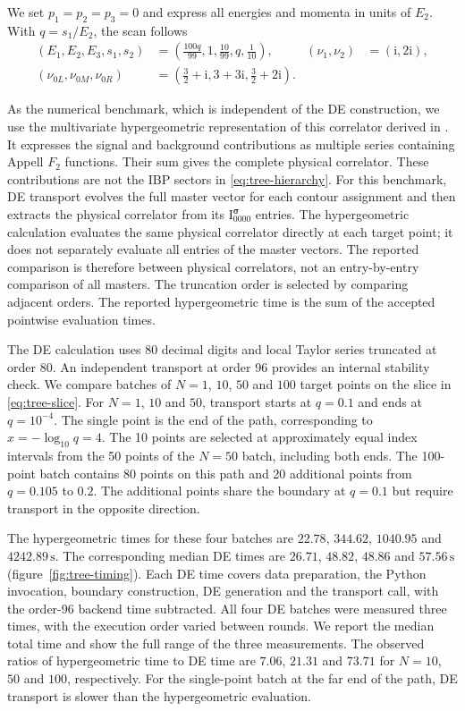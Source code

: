 \documentclass[11pt,a4paper]{article}
\newcommand{\ii}{\mathrm i}
\begin{document}
We set $p_1=p_2=p_3=0$ and express all energies and momenta in units of $E_2$.
With $q=s_1/E_2$, the scan follows
\begin{equation}
 \begin{aligned}
 (E_1,E_2,E_3,s_1,s_2)
 &=\left(\frac{100q}{99},1,\frac{10}{99},q,\frac{1}{10}\right),
 & (\nu_1,\nu_2)&=(\ii,2\ii),\\
 (\nu_{0L},\nu_{0M},\nu_{0R})
 &=\left(\frac32+\ii,3+3\ii,\frac32+2\ii\right).&&
 \end{aligned}
 \label{eq:tree-slice}
\end{equation}

As the numerical benchmark, which is independent of the DE construction, we use the multivariate
hypergeometric representation of this correlator derived
in \cite{Xianyu:2023ytd}.
It expresses the signal and background contributions as multiple series
containing Appell $F_2$ functions. Their sum gives the complete physical
correlator. These contributions are not the IBP sectors in
\eqref{eq:tree-hierarchy}.
For this benchmark, DE transport evolves the full master vector for each
contour assignment and then extracts the physical correlator from its
$\text{I}^{\boldsymbol\sigma}_{0000}$ entries. The hypergeometric calculation
evaluates the same physical correlator directly at each target point;
it does not separately evaluate all entries of the master vectors.
The reported comparison is therefore between physical correlators,
not an entry-by-entry comparison of all masters.
The truncation order is selected by comparing adjacent orders.
The reported hypergeometric time is the sum of the accepted
pointwise evaluation times.

The DE calculation uses 80 decimal digits and local Taylor series truncated at order 80.
An independent transport at order 96 provides an internal stability check.
We compare batches of $N=1$, $10$, $50$ and $100$ target points on the slice in \eqref{eq:tree-slice}.
For $N=1$, $10$ and $50$, transport starts at $q=0.1$ and ends at $q=10^{-4}$.
The single point is the end of the path, corresponding to $x=-\log_{10}q=4$.
The 10 points are selected at approximately equal index intervals from the 50 points of the
$N=50$ batch, including both ends.
The 100-point batch contains 80 points on this path and 20 additional points from $q=0.105$ to $0.2$.
The additional points share the boundary at $q=0.1$ but require transport in the opposite direction.

The hypergeometric times for these four batches are $22.78$, $344.62$, $1040.95$ and $4242.89\,\mathrm{s}$.
The corresponding median DE times are $26.71$, $48.82$, $48.86$ and $57.56\,\mathrm{s}$
(figure~\ref{fig:tree-timing}).
Each DE time covers data preparation, the Python invocation, boundary construction, DE generation
and the transport call, with the order-96 backend time subtracted.
All four DE batches were measured three times, with the execution order varied between rounds.
We report the median total time and show the full range of the three measurements.
The observed ratios of hypergeometric time to DE time are $7.06$, $21.31$ and $73.71$ for
$N=10$, $50$ and $100$, respectively.
For the single-point batch at the far end of the path, DE transport is slower than the
hypergeometric evaluation.
\end{document}
